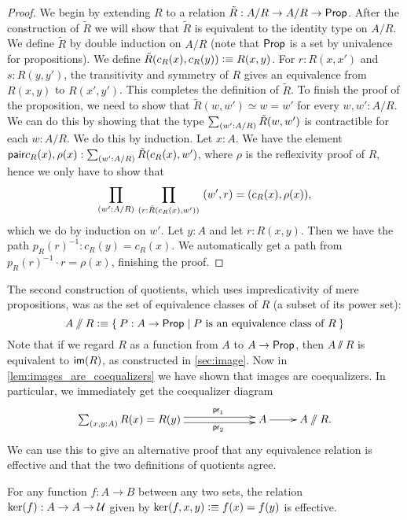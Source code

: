 \begin{proof}
We begin by extending $R$ to a relation $\tilde{R}:A/R\to A/R\to\mathsf{Prop}$. After
the construction of $\tilde{R}$ we will show that $\tilde{R}$ is equivalent
to the identity type on $A/R$. We define $\tilde{R}$ by double induction on
$A/R$ (note that $\mathsf{Prop}$ is a set by univalence for propositions). We
define $\tilde{R}(c_R(x),c_R(y)) \vcentcolon\equiv R(x,y)$. For $r:R(x,x')$ and $s:R(y,y')$,
the transitivity and symmetry 
of $R$ gives an equivalence from $R(x,y)$ to $R(x',y')$. This completes the
definition of $\tilde{R}$. To finish the proof of the proposition, we need
to show that $\tilde{R}(w,w')\simeq w= w'$ for every $w,w':A/R$. We can
do this by showing that the type $\sm{w':A/R} \tilde{R}(w,w')$ is contractible for
each $w:A/R$. We do this by induction. Let $x:A$. We have the element
$\pair{c_R(x),\rho(x)}:\sm{w':A/R} \tilde{R}(c_R(x),w')$, where $\rho$ is
the reflexivity proof of $R$, hence we only
have to show that
\begin{equation*}
\prd{w':A/R}{r:\tilde{R}(c_R(x),w')} \pairr{w',r}=\pairr{c_R(x),\rho(x)},
\end{equation*}
which we do by induction on $w'$. Let $y:A$ and let $r:R(x,y)$. Then we have
the path $p_R(r)^{-1}:c_R(y)= c_R(x)$. We automatically get a path from
$p_R(r)^{-1}\cdot r=\rho(x)$, finishing the proof.
\end{proof}

The second construction of quotients, which uses impredicativity of mere propositions, was as the set of equivalence classes of $R$ (a subset of its power set):
\[ A\sslash R \defeq \setof{ P:A\to\prop | P \text{ is an equivalence class of } R} \]
Note that if we regard $R$ as a function from $A$ to $A\to \mathsf{Prop}$, then $A\sslash R$ is equivalent to $\mathsf{im}(R)$, as constructed in \autoref{sec:image}.
Now in \autoref{lem:images_are_coequalizers} we have shown that images are
coequalizers. In particular, we immediately get the coequalizer diagram
\begin{equation*}
  \xymatrix{
    **[l]{\sm{x,y:A} R (x)= R (y)}
    \ar@<0.25em>[r]^{\proj1}
    \ar@<-0.25em>[r]_{\proj2}
    &
    {A}
    \ar[r]
    &
    {A \sslash R.}
  }
\end{equation*}
We can use this to give an alternative proof that any equivalence relation is effective and that the two definitions of quotients agree.

\begin{thm}\label{prop:kernels_are_effective}
For any function $f:A\to B$ between any two sets, 
the relation $\ker(f):A\to A\to\mathcal{U}$ given by 
$\ker(f,x,y)\vcentcolon\equiv f(x)= f(y)$ is effective. 
\end{thm}

